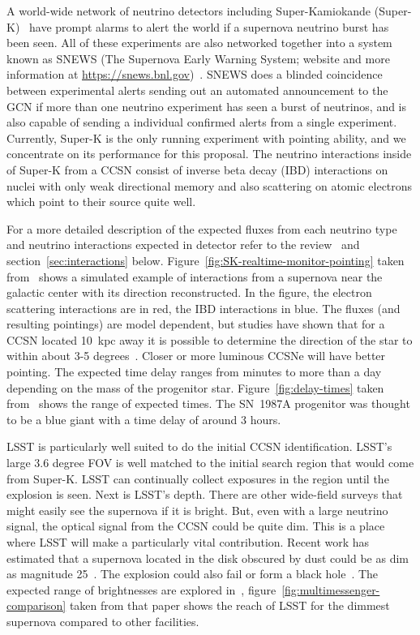 \documentclass[12pt, letterpaper]{article}
\newcommand{\superk}  {Super\nobreakdash-K\xspace}
\begin{document}
A world-wide network of neutrino detectors including Super-Kamiokande
(\superk)~\cite{2003NIMPA.501..418F} have prompt alarms to alert the
world if a supernova neutrino burst has been seen. All of these
experiments are also networked together into a system known as SNEWS
(The Supernova Early Warning System; website and more information at
\url{https://snews.bnl.gov})~\cite{2004NJPh....6..114A}. SNEWS does a
blinded coincidence between experimental alerts sending out an
automated announcement to the GCN if more than one neutrino experiment
has seen a burst of neutrinos, and is also capable of sending a
individual confirmed alerts from a single experiment.  Currently,
\superk is the only running experiment with pointing ability, and we
concentrate on its performance for this proposal.  The neutrino
interactions inside of \superk from a CCSN consist of inverse beta
decay (IBD) interactions on nuclei with only weak directional memory
and also scattering on atomic electrons which point to their source
quite well.

For a more detailed description of the expected fluxes from each
neutrino type and neutrino interactions expected in detector refer to
the review~\cite{2012ARNPS..62...81S} and
section~\ref{sec:interactions} below.
Figure~\ref{fig:SK-realtime-monitor-pointing} taken
from~\cite{2016APh....81...39A} shows a simulated example of
interactions from a supernova near the galactic center with its
direction reconstructed.  In the figure, the electron scattering
interactions are in red, the IBD interactions in blue.  The fluxes
(and resulting pointings) are model dependent, but studies have shown
that for a CCSN located 10~kpc away it is possible to determine the
direction of the star to within about 3-5
degrees~\cite{2016APh....81...39A}.  Closer or more luminous CCSNe
will have better pointing.  The expected time delay ranges from
minutes to more than a day depending on the mass of the progenitor
star. Figure~\ref{fig:delay-times} taken
from~\cite{2013ApJ...778...81K} shows the range of expected times.
The SN~1987A progenitor was thought to be a blue giant with a time
delay of around 3 hours.

LSST is particularly well suited to do the initial CCSN
identification.  LSST's large 3.6 degree FOV is well matched to the
initial search region that would come from \superk.
LSST can continually collect exposures in the region until the
explosion is seen. Next is LSST's depth.  There are other wide-field
surveys that might easily see the supernova if it is bright.  But,
even with a large neutrino signal, the optical signal from the CCSN
could be quite dim.  This is a place where LSST will make a
particularly vital contribution.  Recent work has estimated that a
supernova located in the disk obscured by dust could be as dim as
magnitude 25~\cite{2016MNRAS.461.3296N}.  The explosion could also
fail or form a black hole~\cite{2011ApJ...730...70O,
  2017hsn..book.1555O}.  The expected range of brightnesses are
explored in~\cite{2016MNRAS.461.3296N},
figure~\ref{fig:multimessenger-comparison} taken from that paper shows
the reach of LSST for the dimmest supernova compared to other
facilities.
\end{document}
